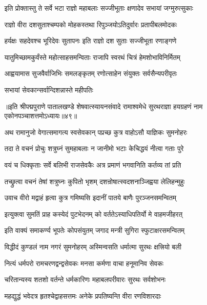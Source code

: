 \twolineshloka
{इति प्रोक्तास्तु ते सर्वे भटा राज्ञो महाबलाः}
{सज्जीभूताः क्षणादेव सभायां जग्मुरुत्सुकाः}%

\twolineshloka
{राज्ञो वीरा दशसुताश्चम्पको मोहकस्तथा}
{रिपुञ्जयोऽतिदुर्वारः प्रतापीबलमोदकः}%

\twolineshloka
{हर्यक्षः सहदेवश्च भूरिदेवः सुतापनः}
{इति राज्ञो दश सुताः सज्जीभूता रणाङ्गणे}%

\twolineshloka
{यातुमिच्छामकुर्वंस्ते महोत्साहसमन्विताः}
{राजापि स्वरथं चित्रं हेमशोभाविनिर्मितम्}%

\twolineshloka
{आह्वयामास सुजवैर्वाजिभिः समलङ्कृतम्}
{रणोत्साहेन संयुक्तः सर्वसैन्यपरीवृतः}%

\onelineshloka
{सभायां सेवकान्सर्वान्दिशन्नास्ते महीपतिः}%

{॥इति श्रीपद्मपुराणे पातालखण्डे शेषवात्स्यायनसंवादे रामाश्वमेधे सुरथराज्ञा हयग्रहणं नाम एकोनपञ्चाशत्तमोऽध्यायः॥४९॥}



\twolineshloka
{अथ रामानुजो वेगात्समागत्य स्वसेवकान्}
{पप्रच्छ कुत्र वाहोऽसौ याज्ञिकः सुमनोहरः}%

\twolineshloka
{तदा ते वचनं प्रोचुः शत्रुघ्नं सुमहाबलाः}
{न जानीमो भटाः केचिद्धयं नीत्वा गताः पुरे}%

\twolineshloka
{वयं च धिक्कृताः सर्वे बलिभी राजसेवकैः}
{अत्र प्रमाणं भगवानिति कर्तव्य तां प्रति}%

\twolineshloka
{तच्छ्रुत्वा वचनं तेषां शत्रुघ्नः कुपितो भृशम्}
{दशन्रोषात्स्वदशनाञ्जिह्वया लेलिहन्मुहुः}%

\twolineshloka
{उवाच वीरो मद्वाहं हृत्वा कुत्र गमिष्यसि}
{इदानीं पातये बाणैः पुरञ्जनसमन्वितम्}%

\twolineshloka
{इत्युक्त्वा सुमतिं प्राह कस्येदं पुटभेदनम्}
{को वर्ततेऽस्याधिपतिर्यो मे वाहमजीहरत्}%


\twolineshloka
{इति वाक्यं समाकर्ण्य भूपतेः कोपसंयुतम्}
{जगाद मन्त्री सुगिरा स्फुटाक्षरसमन्वितम्}%

\twolineshloka
{विद्धीदं कुण्डलं नाम नगरं सुमनोहरम्}
{अस्मिन्वसति धर्मात्मा सुरथः क्षत्त्रियो बली}%

\twolineshloka
{नित्यं धर्मपरो रामचरणद्वन्द्वसेवकः}
{मनसा कर्मणा वाचा हनूमानिव सेवकः}%

\twolineshloka
{चरितान्यस्य शतशो वर्तन्ते धर्मकारिणः}
{महाबलपरीवारः सुरथः सर्वशोभनः}%

\twolineshloka
{महद्युद्धं भवेदत्र हृतश्चेद्वाहसत्तमः}
{अनेके प्रपतिष्यन्ति वीरा रणविशारदाः}%

